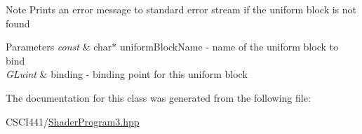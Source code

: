 \begin{DoxyNote}{Note}
Prints an error message to standard error stream if the uniform block is not found 
\end{DoxyNote}

\begin{DoxyParams}{Parameters}
{\em const} & char$\ast$ uniform\+Block\+Name -\/ name of the uniform block to bind \\
\hline
{\em G\+Luint} & binding -\/ binding point for this uniform block \\
\hline
\end{DoxyParams}


The documentation for this class was generated from the following file\+:\begin{DoxyCompactItemize}
\item 
C\+S\+C\+I441/\hyperlink{_shader_program3_8hpp}{Shader\+Program3.\+hpp}\end{DoxyCompactItemize}
